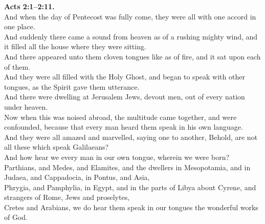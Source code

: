 \documentclass[10pt]{article} %
\begin{document}
{\begin{minipage}[t]{0.45\textwidth}
\textbf{Acts 2:1--2:11.}\\
And when the day of Pentecost was fully come, they were all with one accord in one place.\\
And suddenly there came a sound from heaven as of a rushing mighty wind, and it filled all the house where they were sitting.\\
And there appeared unto them cloven tongues like as of fire, and it sat upon each of them.\\
And they were all filled with the Holy Ghost, and began to speak with other tongues, as the Spirit gave them utterance.\\
And there were dwelling at Jerusalem Jews, devout men, out of every nation under heaven.\\
Now when this was noised abroad, the multitude came together, and were confounded, because that every man heard them speak in his own language.\\
And they were all amazed and marvelled, saying one to another, Behold, are not all these which speak Galilaeans?\\
And how hear we every man in our own tongue, wherein we were born?\\
Parthians, and Medes, and Elamites, and the dwellers in Mesopotamia, and in Judaea, and Cappadocia, in Pontus, and Asia,\\
Phrygia, and Pamphylia, in Egypt, and in the parts of Libya about Cyrene, and strangers of Rome, Jews and proselytes,\\
Cretes and Arabians, we do hear them speak in our tongues the wonderful works of God.\\

\end{minipage}}
\vspace*{\fill}
\newpage
\Huge%
\vspace*{\fill}
\end{document}
